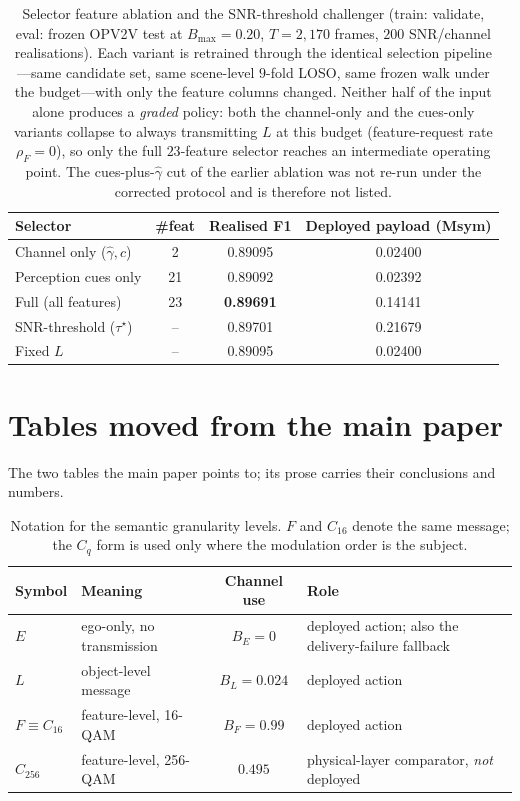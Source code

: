 \documentclass[journal]{IEEEtran}
\begin{document}
\begin{table}[t]
\centering
\footnotesize
\setlength{\tabcolsep}{3pt}
\caption{Selector feature ablation and the SNR-threshold challenger (train: validate, eval: frozen OPV2V test at $B_{\max}=0.20$, $T=2{,}170$ frames, $200$ SNR/channel realisations). Each variant is retrained through the identical selection pipeline---same candidate set, same scene-level $9$-fold LOSO, same frozen walk under the budget---with only the feature columns changed. Neither half of the input alone produces a \emph{graded} policy: both the channel-only and the cues-only variants collapse to always transmitting $L$ at this budget (feature-request rate $\rho_F=0$), so only the full $23$-feature selector reaches an intermediate operating point. The cues-plus-$\hat\gamma$ cut of the earlier ablation was not re-run under the corrected protocol and is therefore not listed.}
\label{tab:ablation}
\begin{tabular}{lccc}
\toprule
Selector & \#feat & Realised F1 & Deployed payload (Msym) \\
\midrule
Channel only ($\hat\gamma,c$)        & 2  & 0.89095 & 0.02400 \\
Perception cues only                 & 21 & 0.89092 & 0.02392 \\
Full (all features)                  & 23 & \textbf{0.89691} & 0.14141 \\
SNR-threshold ($\tau^\star$)          & -- & 0.89701 & 0.21679 \\
\midrule
Fixed $L$                            & -- & 0.89095 & 0.02400 \\
\bottomrule
\end{tabular}
\end{table}



\section{Tables moved from the main paper}\label{sec:moved_tables}
The two tables the main paper points to; its prose carries their conclusions and numbers.

\begin{table}[t]
\centering
\footnotesize
\setlength{\tabcolsep}{3pt}
\caption{Notation for the semantic granularity levels. $F$ and $C_{16}$ denote the same message; the $C_q$ form is used only where the modulation order is the subject.}
\label{tab:notation}
\begin{tabular}{llcl}
\toprule
Symbol & Meaning & Channel use & Role \\
\midrule
$E$ & ego-only, no transmission & $B_E = 0$ & deployed action; also the delivery-failure fallback \\
$L$ & object-level message & $B_L = 0.024$ & deployed action \\
$F \equiv C_{16}$ & feature-level, 16-QAM & $B_F = 0.99$ & deployed action \\
$C_{256}$ & feature-level, 256-QAM & $0.495$ & physical-layer comparator, \emph{not} deployed \\
\bottomrule
\end{tabular}
\end{table} 
\end{document}
